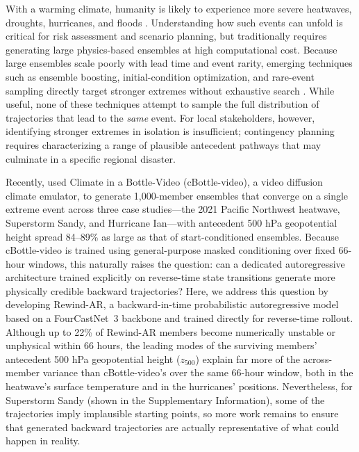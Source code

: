 \documentclass{article}
\begin{document}
With a warming climate, humanity is likely to experience more severe heatwaves, droughts, hurricanes, and floods \citep{Domeisen2022-gj,Hirabayashi2013-ry, Knutson2020-tj, Fischer2025-na, IPCC2023Sections, Cook2020-xw}. Understanding how such events can unfold is critical for risk assessment and scenario planning, but traditionally requires generating large physics-based ensembles at high computational cost. Because large ensembles scale poorly with lead time and event rarity, emerging techniques such as ensemble boosting, initial-condition optimization, and rare-event sampling directly target stronger extremes without exhaustive search \citep{Ragone2018-rj, Gessner2021-qy, Finkel2024-ln, Finkel2026-uu, Whittaker2026-fe, Hakim2026-oy, Lancelin2026-om}. While useful, none of these techniques attempt to sample the full distribution of trajectories that lead to the \textit{same} event. For local stakeholders, however, identifying stronger extremes in isolation is insufficient; contingency planning requires characterizing a range of plausible antecedent pathways that may culminate in a specific regional disaster.

Recently, \citet{Lin2026-sz} used Climate in a Bottle-Video (cBottle-video), a video diffusion climate emulator, to generate 1,000-member ensembles that converge on a single extreme event across three case studies---the 2021 Pacific Northwest heatwave, Superstorm Sandy, and Hurricane Ian---with antecedent 500 hPa geopotential height spread 84--89\% as large as that of start-conditioned ensembles. Because cBottle-video is trained using general-purpose masked conditioning over fixed 66-hour windows, this naturally raises the question: can a dedicated autoregressive architecture trained explicitly on reverse-time state transitions generate more physically credible backward trajectories? Here, we address this question by developing Rewind-AR, a backward-in-time probabilistic autoregressive model based on a FourCastNet~3 backbone \citep{Bonev2025-dw} and trained directly for reverse-time rollout. Although up to 22\% of Rewind-AR members become numerically unstable or unphysical within 66 hours, the leading modes of the surviving members' antecedent 500 hPa geopotential height ($z_{500}$) explain far more of the across-member variance than cBottle-video's over the same 66-hour window, both in the heatwave's surface temperature and in the hurricanes' positions. Nevertheless, for Superstorm Sandy (shown in the Supplementary Information), some of the trajectories imply implausible starting points, so more work remains to ensure that generated backward trajectories are actually representative of what could happen in reality.
\end{document}
